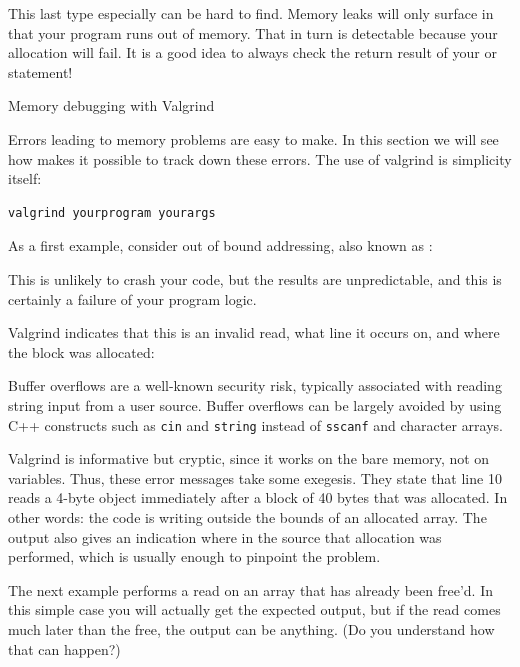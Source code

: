 This last type especially can be hard to find.
Memory leaks will only surface in that your program runs out of
  memory. That in turn is detectable because your allocation will
  fail. It is a good idea to always check the return result of your
   or  statement!

 {Memory debugging with Valgrind}
\label{sec:valgrind}

Errors leading to memory problems are easy to make.
In this section we will see how 
makes it possible to track down these errors.
The use of valgrind is simplicity itself:
\begin{lstlisting}
valgrind yourprogram yourargs
\end{lstlisting}

As a first example, consider out of bound addressing,
also known as :
%

This is unlikely to crash your code,
but the results are unpredictable,
and this is certainly a failure of your program logic.

Valgrind indicates that this is an invalid read,
what line it occurs on,
and where the block was allocated:
%


\begin{remark}
  Buffer overflows are a well-known security risk,
  typically associated with reading string input
  from a user source.
  Buffer overflows can be largely avoided by using
  C++ constructs such as \lstinline{cin} and \lstinline{string}
  instead of \lstinline{sscanf} and character arrays.
\end{remark}

Valgrind is informative but cryptic, since it works on the bare
memory, not on variables. Thus, these error messages take some
exegesis. They state that line 10 reads a 4-byte object immediately
after a block of 40 bytes that was allocated. In other words: the code
is writing outside the bounds of an allocated array.
The output also gives an indication where in the source
that allocation was performed, which is usually enough to pinpoint the problem.

The next example performs a read on an array that has already been free'd.
In this simple case you will actually get the expected output,
but if the read comes much later than the free, the output can be anything.
(Do you understand how that can happen?)
%

